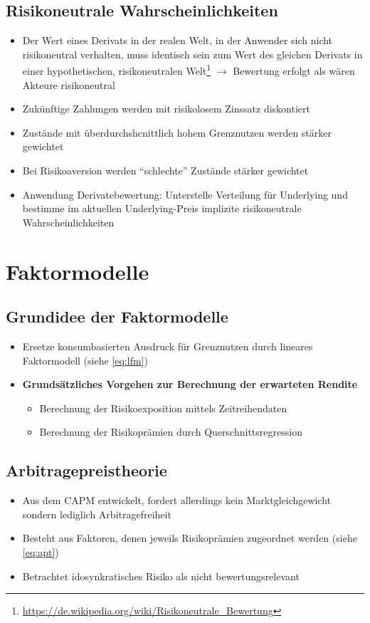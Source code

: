 \subsection{Risikoneutrale Wahrscheinlichkeiten}
\begin{itemize}
	\item Der Wert eines Derivats in der realen Welt, in der Anwender sich nicht risikoneutral verhalten, muss identisch sein zum Wert des gleichen Derivats in einer hypothetischen, risikoneutralen Welt\footnote{\url{https://de.wikipedia.org/wiki/Risikoneutrale_Bewertung}} \(\rightarrow\) Bewertung erfolgt als wären Akteure risikoneutral
	\item Zukünftige Zahlungen werden mit risikolosem Zinssatz diskontiert
	\item Zustände mit überdurchshcnittlich hohem Grenznutzen werden stärker gewichtet
	\item Bei Risikoaversion werden "`schlechte"' Zustände stärker gewichtet
	\item Anwendung Derivatebewertung: Unterstelle Verteilung für Underlying und bestimme im aktuellen Underlying-Preis implizite risikoneutrale Wahrscheinlichkeiten
\end{itemize}



\section{Faktormodelle}

\subsection{Grundidee der Faktormodelle}
\begin{itemize}
	\item Ersetze konsumbasierten Ausdruck für Grenznutzen durch lineares Faktormodell (siehe \ref{eq:lfm})
	\item \textbf{Grundsätzliches Vorgehen zur Berechnung der erwarteten Rendite}
	\begin{itemize}
		\item Berechnung der Risikoexposition mittels Zeitreihendaten
		\item Berechnung der Risikoprämien durch Querschnittsregression
	\end{itemize}
\end{itemize}


\subsection{Arbitragepreistheorie}
\begin{itemize}
	\item Aus dem CAPM entwickelt, fordert allerdings kein Marktgleichgewicht sondern lediglich Arbitragefreiheit
	\item Besteht aus Faktoren, denen jeweils Risikoprämien zugeordnet werden (siehe \ref{eq:apt})
	\item Betrachtet idosynkratisches Risiko als nicht bewertungsrelevant
\end{itemize}

